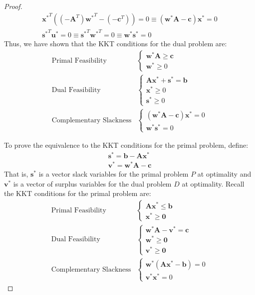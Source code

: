 \begin{proof}
\begin{gather*}
{\mathbf{x}^*}^T\left((-\mathbf{A}^T){\mathbf{w}^*}^T - (-\mathbf{c}^T)\right) = 0 \equiv (\mathbf{w}^*\mathbf{A} - \mathbf{c})\mathbf{x}^* = 0\\
{\mathbf{s}^*}^T\mathbf{u}^* = 0 \equiv {\mathbf{s}^*}^T{\mathbf{w}^*}^T = 0 \equiv \mathbf{w}^*\mathbf{s}^* = 0
\end{gather*}
Thus, we have shown that the KKT conditions for the dual problem are:
\begin{align*}
\text{Primal Feasibility}&\left\{ 
\begin{aligned}
\mathbf{w}^*\mathbf{A} \geq \mathbf{c}\\
\mathbf{w}^* \geq 0
\end{aligned}\right.\\
\text{Dual Feasibility}&\left\{ 
\begin{aligned}
\mathbf{A}\mathbf{x}^* + \mathbf{s}^* = \mathbf{b}\\
\mathbf{x}^* \geq 0\\
\mathbf{s}^* \geq 0
\end{aligned}\right.\\
\text{Complementary Slackness}&\left\{ 
\begin{aligned}
\left(\mathbf{w}^*\mathbf{A} - \mathbf{c}\right)\mathbf{x}^* = 0\\
\mathbf{w}^*\mathbf{s}^* = 0
\end{aligned}\right.
\end{align*}

To prove the equivalence to the KKT conditions for the primal problem, define:
\begin{gather}
\mathbf{s}^* = \mathbf{b} - \mathbf{A}\mathbf{x}^* \\
\mathbf{v}^* = \mathbf{w}^*\mathbf{A} - \mathbf{c}
\end{gather}
That is, $\mathbf{s}^*$ is a vector slack variables for the primal problem $P$ at optimality and $\mathbf{v}^*$ is a vector of surplus variables for the dual problem $D$ at optimality. Recall the KKT conditions for the primal problem are:
\begin{align*}
\text{Primal Feasibility}&\left\{ 
\begin{aligned}
\mathbf{A}\mathbf{x}^* \leq \mathbf{b}\\
\mathbf{x}^* \geq \mathbf{0}
\end{aligned}\right.\\
\text{Dual Feasibility}&\left\{ 
\begin{aligned}
\mathbf{w}^*\mathbf{A} - \mathbf{v}^* = \mathbf{c}\\
\mathbf{w}^* \geq \mathbf{0}\\
\mathbf{v}^* \geq \mathbf{0}
\end{aligned}\right.\\
\text{Complementary Slackness}&\left\{ 
\begin{aligned}
\mathbf{w}^*\left(\mathbf{A}\mathbf{x}^* - \mathbf{b}\right) = 0\\
\mathbf{v}^*\mathbf{x}^* = 0
\end{aligned}\right.
\end{align*}


\end{proof}
